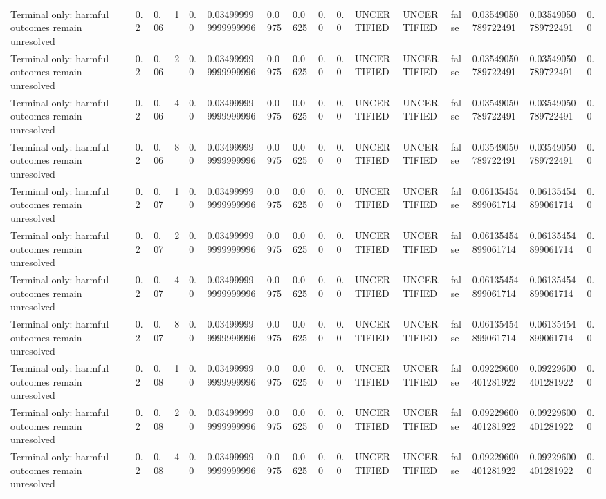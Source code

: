 \begin{tabular}{llllllllllllllll}
Terminal only: harmful outcomes remain unresolved & 0.2 & 0.06 & 1 & 0.0 & 0.034999999999999996 & 0.0975 & 0.0625 & 0.0 & 0.0 & UNCERTIFIED & UNCERTIFIED & false & 0.03549050789722491 & 0.03549050789722491 & 0.0 \\
Terminal only: harmful outcomes remain unresolved & 0.2 & 0.06 & 2 & 0.0 & 0.034999999999999996 & 0.0975 & 0.0625 & 0.0 & 0.0 & UNCERTIFIED & UNCERTIFIED & false & 0.03549050789722491 & 0.03549050789722491 & 0.0 \\
Terminal only: harmful outcomes remain unresolved & 0.2 & 0.06 & 4 & 0.0 & 0.034999999999999996 & 0.0975 & 0.0625 & 0.0 & 0.0 & UNCERTIFIED & UNCERTIFIED & false & 0.03549050789722491 & 0.03549050789722491 & 0.0 \\
Terminal only: harmful outcomes remain unresolved & 0.2 & 0.06 & 8 & 0.0 & 0.034999999999999996 & 0.0975 & 0.0625 & 0.0 & 0.0 & UNCERTIFIED & UNCERTIFIED & false & 0.03549050789722491 & 0.03549050789722491 & 0.0 \\
Terminal only: harmful outcomes remain unresolved & 0.2 & 0.07 & 1 & 0.0 & 0.034999999999999996 & 0.0975 & 0.0625 & 0.0 & 0.0 & UNCERTIFIED & UNCERTIFIED & false & 0.06135454899061714 & 0.06135454899061714 & 0.0 \\
Terminal only: harmful outcomes remain unresolved & 0.2 & 0.07 & 2 & 0.0 & 0.034999999999999996 & 0.0975 & 0.0625 & 0.0 & 0.0 & UNCERTIFIED & UNCERTIFIED & false & 0.06135454899061714 & 0.06135454899061714 & 0.0 \\
Terminal only: harmful outcomes remain unresolved & 0.2 & 0.07 & 4 & 0.0 & 0.034999999999999996 & 0.0975 & 0.0625 & 0.0 & 0.0 & UNCERTIFIED & UNCERTIFIED & false & 0.06135454899061714 & 0.06135454899061714 & 0.0 \\
Terminal only: harmful outcomes remain unresolved & 0.2 & 0.07 & 8 & 0.0 & 0.034999999999999996 & 0.0975 & 0.0625 & 0.0 & 0.0 & UNCERTIFIED & UNCERTIFIED & false & 0.06135454899061714 & 0.06135454899061714 & 0.0 \\
Terminal only: harmful outcomes remain unresolved & 0.2 & 0.08 & 1 & 0.0 & 0.034999999999999996 & 0.0975 & 0.0625 & 0.0 & 0.0 & UNCERTIFIED & UNCERTIFIED & false & 0.09229600401281922 & 0.09229600401281922 & 0.0 \\
Terminal only: harmful outcomes remain unresolved & 0.2 & 0.08 & 2 & 0.0 & 0.034999999999999996 & 0.0975 & 0.0625 & 0.0 & 0.0 & UNCERTIFIED & UNCERTIFIED & false & 0.09229600401281922 & 0.09229600401281922 & 0.0 \\
Terminal only: harmful outcomes remain unresolved & 0.2 & 0.08 & 4 & 0.0 & 0.034999999999999996 & 0.0975 & 0.0625 & 0.0 & 0.0 & UNCERTIFIED & UNCERTIFIED & false & 0.09229600401281922 & 0.09229600401281922 & 0.0 \\

\end{tabular}

